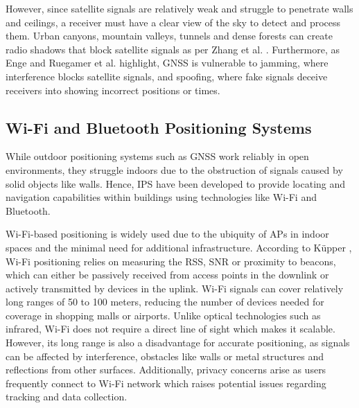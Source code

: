 However, since satellite signals are relatively weak and struggle to penetrate walls and ceilings, a receiver must have a clear view of the sky to detect and process them.
Urban canyons, mountain valleys, tunnels and dense forests can create radio shadows that block satellite signals as per Zhang et al. \cite{zhang2021gnss}. 
Furthermore, as Enge \cite{enge1994global} and Ruegamer et al. \cite{ruegamer2015jamming} highlight, \acs{GNSS} is vulnerable to jamming, where interference blocks satellite signals, and spoofing, where fake signals deceive receivers into showing incorrect positions or times.

\subsection{Wi-Fi and Bluetooth Positioning Systems}
While outdoor positioning systems such as \acs{GNSS} work reliably in open environments, they struggle indoors due to the obstruction of signals caused by solid objects like walls.
Hence, \ac{IPS} have been developed to provide locating and navigation capabilities within buildings using technologies like \acs{Wi-Fi} and Bluetooth.

\acs{Wi-Fi}-based positioning is widely used due to the ubiquity of \acs{APs} in indoor spaces and the minimal need for additional infrastructure.
According to K\"upper \cite{kupper2005location}, \acs{Wi-Fi} positioning relies on measuring the \acs{RSS}, \ac{SNR} or proximity to beacons, which can either be passively received from access points in the downlink or actively transmitted by devices in the uplink.
\acs{Wi-Fi} signals can cover relatively long ranges of 50 to 100 meters, reducing the number of devices needed for coverage in shopping malls or airports.
Unlike optical technologies such as infrared, \acs{Wi-Fi} does not require a direct line of sight which makes it scalable. 
However, its long range is also a disadvantage for accurate positioning, as signals can be affected by interference, obstacles like walls or metal structures and reflections from other surfaces. 
Additionally, privacy concerns arise as users frequently connect to \acs{Wi-Fi} network which raises potential issues regarding tracking and data collection.

